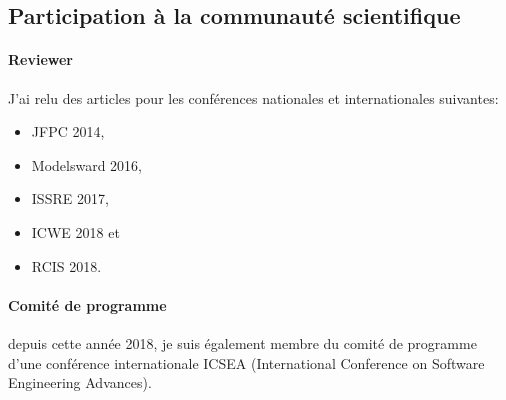 \subsection{Participation à la communauté scientifique}

\paragraph*{Reviewer} J'ai relu des articles pour les conférences nationales et internationales suivantes:

\begin{itemize}
\item JFPC 2014,
\item Modelsward 2016,
\item ISSRE 2017,
\item ICWE 2018 et
\item RCIS 2018.
\end{itemize}  

\paragraph*{Comité de programme} depuis cette année 2018, je suis également membre du comité de programme d'une conférence internationale ICSEA (International Conference on Software Engineering Advances). 